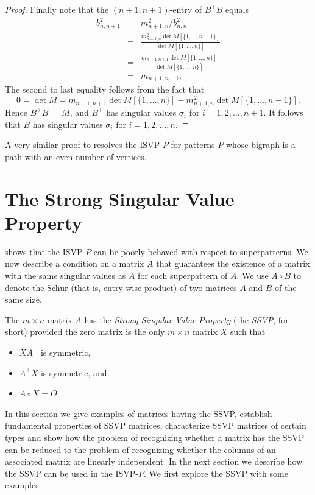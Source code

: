 \documentclass[preprint,12pt]{elsarticle}
\newcommand{\trans  }{^\top}
\begin{document}
\begin{proof}
Finally note that the $(n+1, n+1)$-entry of $B\trans B$ equals
\begin{eqnarray*}
b_{n,n+1}^2 & = &  m_{n+1,n}^2/b_{n,n}^2\\
& = & \frac{ m_{n+1,n}^2 \det M[\{1,\ldots, n-1\}]}{ \det M[\{1, \ldots, n\} ]} \\ 
&= & \frac{ m_{n+1,n+1} \det M[\{1,\ldots, n\}]}{ \det M[\{1,\ldots, n\}]} \\
& = &  m_{n+1,n+1}.
\end{eqnarray*}
The second to last equality follows from the fact that 
\[ 0=\det M=
m_{n+1,n+1} \det M[\{1,\ldots, n\}] - m_{n+1,n}^2 \det M[\{1,\ldots, n-1\}]. 
\] 
Hence $B\trans B\ =M$, and $B\trans$ has singular values $\sigma_i$ for $i=1,2,\ldots, n+1$.  It follows that $B$ has singular values $\sigma_i$
for $i=1,2,\ldots, n$.
\end{proof}

A very similar proof to  resolves the ISVP-$P$ for patterns $P$ whose bigraph is a path with an even number of vertices. 

\section{The Strong Singular Value Property}
  shows that the ISVP-$P$ can be poorly behaved with respect to superpatterns.
We now describe a condition on a matrix $A$ that guarantees the existence of a matrix 
with the same singular values as $A$ for each superpattern of $A$. We use $A\circ B$
to denote the Schur (that is, entry-wise product) of two matrices $A$ and $B$ of the same size. 

The $m\times n$ matrix $A$ has the \textit{Strong Singular Value Property} (the {\it SSVP}, for short) provided the zero matrix is the only $m\times n$ matrix $X$ such that 
\begin{itemize}
\item[(a)] $XA\trans $ is symmetric,
\item[(b)]  $A\trans  X$ is symmetric, and 
\item[(c)]  $A \circ X=O$.
\end{itemize}

In this section we give examples of matrices having the  SSVP, establish fundamental properties of SSVP matrices, characterize SSVP matrices of 
certain types and show how the problem of recognizing whether a matrix has the SSVP 
can be reduced to the problem of recognizing whether the columns of an associated 
matrix are linearly independent. In the next section we describe how the SSVP can be used 
in the ISVP-$P$. We first explore the SSVP with some examples. 
\end{document}

